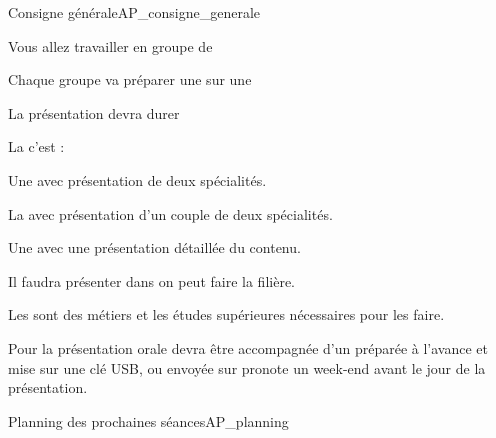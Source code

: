 \teteSndAP


\begin{doc}{Consigne générale}{AP_consigne_generale}
  \begin{listePoints}
    \item Vous allez travailler en groupe de 
    \item Chaque groupe va préparer une  sur une 
    \item La présentation devra durer 
    \item La  c'est :
    \begin{listePoints}
      \item Une  avec présentation de deux spécialités.
      \item La  avec présentation d'un couple de deux spécialités.
      \item Une  avec une présentation détaillée du contenu.
    \end{listePoints}
    \item Il faudra présenter dans  on peut faire la filière.
    \item Les  sont des métiers et les études supérieures nécessaires pour les faire.
  \end{listePoints}

  Pour la présentation orale devra être accompagnée d'un  préparée à l'avance et mise sur une clé USB, ou envoyée sur pronote un week-end avant le jour de la présentation.
\end{doc}

\begin{doc}{Planning des prochaines séances}{AP_planning}
  \strut\vspace*{8pt}
  
  \vspace*{-8 cm}
  
  \begin{programmeSeance}[2]
  \end{programmeSeance}
  \vspace*{1.2 cm}
  \begin{programmeSeance}[2]
  \end{programmeSeance}
\end{doc}

